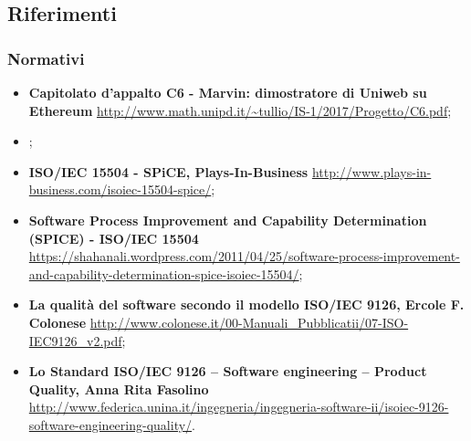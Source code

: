 \subsection{Riferimenti}
\subsubsection{Normativi}
\begin{itemize}
	\item
	\textbf{Capitolato d’appalto C6 - Marvin: dimostratore di Uniweb su Ethereum}
	\url{http://www.math.unipd.it/~tullio/IS-1/2017/Progetto/C6.pdf};
	
	\item
	\textbf{\NdP{}};
	 
	\item
	\textbf{ISO/IEC 15504 - SPiCE, Plays-In-Business}
	\url{http://www.plays-in-business.com/isoiec-15504-spice/};
	
	\item
	\textbf{Software Process Improvement and Capability Determination (SPICE) - ISO/IEC 15504}
	\url{https://shahanali.wordpress.com/2011/04/25/software-process-improvement-and-capability-determination-spice-isoiec-15504/};	
	\item
	\textbf{La qualità del software secondo il modello ISO/IEC 9126, Ercole F. Colonese}
	\url{http://www.colonese.it/00-Manuali_Pubblicatii/07-ISO-IEC9126_v2.pdf};
	\item
	\textbf{Lo Standard ISO/IEC 9126 – Software engineering – Product Quality, Anna Rita Fasolino}
	\url{http://www.federica.unina.it/ingegneria/ingegneria-software-ii/isoiec-9126-software-engineering-quality/}.
\end{itemize}

